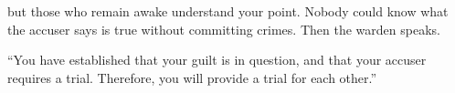 but those who remain awake understand your point.
Nobody could know what the accuser says is true without committing crimes.
Then the \gls{warden} speaks.

``You have established that your guilt is in question, and that your accuser requires a trial.
Therefore, you will provide a trial for each other.''


